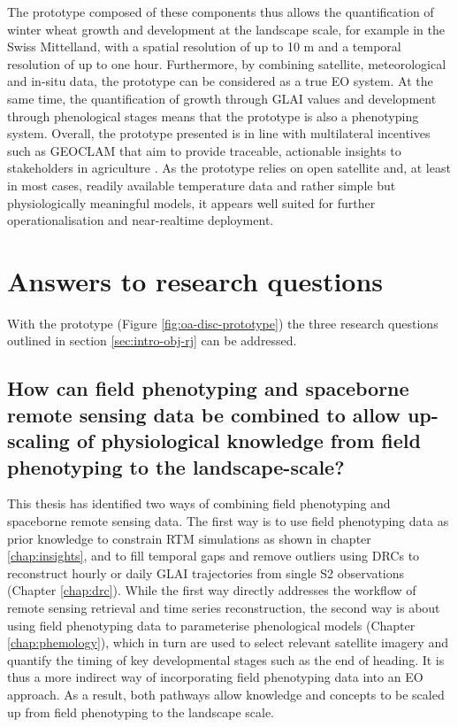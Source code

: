 The prototype composed of these components thus allows the quantification of winter wheat growth and development at the landscape scale, for example in the Swiss Mittelland, with a spatial resolution of up to 10 m and a temporal resolution of up to one hour. Furthermore, by combining satellite, meteorological and in-situ data, the prototype can be considered as a true \gls{EO} system. At the same time, the quantification of growth through \gls{GLAI} values and development through phenological stages means that the prototype is also a phenotyping system. Overall, the prototype presented is in line with multilateral incentives such as \gls{GEOCLAM} that aim to provide traceable, actionable insights to stakeholders in agriculture \citep{whitcraft_no_2019}. As the prototype relies on open satellite and, at least in most cases, readily available temperature data and rather simple but physiologically meaningful models, it appears well suited for further operationalisation and near-realtime deployment.

\section{Answers to research questions}
With the prototype (Figure \ref{fig:oa-disc-prototype}) the three research questions outlined in section \ref{sec:intro-obj-rj} can be addressed.

\subsection{How can field phenotyping and spaceborne remote sensing data be combined to allow up-scaling of physiological knowledge from field phenotyping to the landscape-scale?}
This thesis has identified two ways of combining field phenotyping and spaceborne remote sensing data. The first way is to use field phenotyping data as prior knowledge to constrain \gls{RTM} simulations as shown in chapter \ref{chap:insights}, and to fill temporal gaps and remove outliers using \gls{DRC}s to reconstruct hourly or daily \gls{GLAI} trajectories from single \gls{S2} observations (Chapter \ref{chap:drc}). While the first way directly addresses the workflow of remote sensing retrieval and time series reconstruction, the second way is about using field phenotyping data to parameterise phenological models (Chapter \ref{chap:phemology}), which in turn are used to select relevant satellite imagery and quantify the timing of key developmental stages such as the end of heading. It is thus a more indirect way of incorporating field phenotyping data into an \gls{EO} approach. As a result, both pathways allow knowledge and concepts to be scaled up from field phenotyping to the landscape scale.

